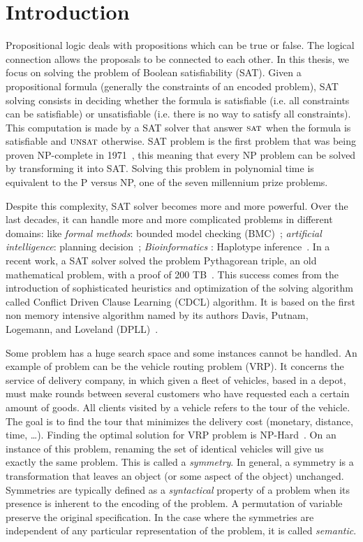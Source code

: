 ﻿\chapter{Introduction}\label{chap:intro}

Propositional logic deals with propositions which can be true or false.
The logical connection allows the proposals to be connected to each other.
In this thesis, we focus on solving the problem of Boolean satisfiability (SAT).
Given a propositional formula (generally the constraints of an encoded problem),
SAT solving consists in deciding whether the formula is satisfiable (i.e. all constraints can be
satisfiable) or unsatisfiable (i.e. there is no way to satisfy all constraints).
This computation is made by a SAT solver that answer $\textsc{sat}$ when the formula is satisfiable
and $\textsc{unsat}$ otherwise.
SAT problem is the first problem that was being proven NP-complete in 1971~\cite{cook1971complexity}, this 
meaning that every NP problem can be solved by transforming it into SAT. Solving this problem in 
polynomial time is equivalent to the P versus NP, one of the seven millennium prize problems.

Despite this complexity, SAT solver becomes more and more powerful.
Over the last decades, it can handle more and more complicated problems in different domains:
like \emph{formal methods}: bounded model checking (BMC)~\cite{bmc_99}; \emph{artificial intelligence}: planning decision~\cite{planning_92}; \emph{Bioinformatics} : Haplotype inference~\cite{biology_06}.
In a recent work, a SAT solver solved the problem Pythagorean triple, an old mathematical problem,
with a proof of 200 TB~\cite{heule2016solving}.
This success comes from the introduction of sophisticated heuristics and optimization of the solving 
algorithm called Conflict Driven Clause Learning (CDCL) algorithm. It is based on the first non memory
intensive algorithm named by its authors Davis, Putnam, Logemann, and Loveland (DPLL)~\cite{dpll_62}.

Some problem has a huge search space and some instances cannot be handled.
An example of problem can be the vehicle routing problem (VRP).
It concerns the service of delivery company, in which
given a fleet of vehicles, based in a depot, must make rounds between several customers  who have requested
each a certain amount of goods. All clients visited by a vehicle refers to the tour of the vehicle. 
The goal is to find the tour that minimizes the delivery cost (monetary, distance, time, …).
Finding the optimal solution for VRP problem is NP-Hard~\cite{toth2002vehicle}.
On an instance of this problem, renaming the set of identical vehicles will give us exactly the same problem.
This is called a \textit{symmetry}. In general, a symmetry is a transformation that leaves an object (or some aspect of the object) unchanged. Symmetries are typically defined as a \textit{syntactical} property of a problem when its presence is inherent to the encoding of the problem. A permutation of variable preserve the original specification. In the case where the symmetries are independent of any 
particular representation of the problem, it is called \textit{semantic}.

